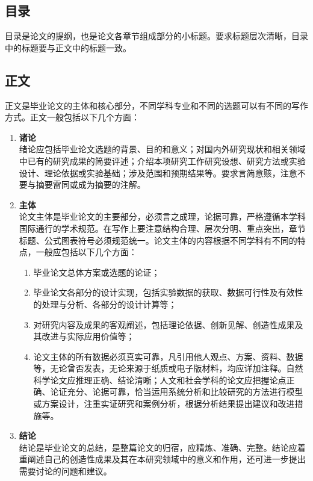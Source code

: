 \subsection{目录}

目录是论文的提纲，也是论文各章节组成部分的小标题。要求标题层次清晰，目录中的标题要与正文中的标题一致。


\subsection{正文}

正文是毕业论文的主体和核心部分，不同学科专业和不同的选题可以有不同的写作方式。正文一般包括以下几个方面：

\begin{enumerate}
    \item \textbf{诸论} \\
    绪论应包括毕业论文选题的背景、目的和意义；对国内外研究现状和相关领域中已有的研究成果的简要评述；介绍本项研究工作研究设想、研究方法或实验设计、理论依据或实验基础；涉及范围和预期结果等。要求言简意赅，注意不要与摘要雷同或成为摘要的注解。
    \item \textbf{主体} \\
    论文主体是毕业论文的主要部分，必须言之成理，论据可靠，严格遵循本学科国际通行的学术规范。在写作上要注意结构合理、层次分明、重点突出，章节标题、公式图表符号必须规范统一。论文主体的内容根据不同学科有不同的特点，一般应包括以下几个方面：
    \begin{enumerate}
        \item 毕业论文总体方案或选题的论证；
        \item 毕业论文各部分的设计实现，包括实验数据的获取、数据可行性及有效性的处理与分析、各部分的设计计算等；
        \item 对研究内容及成果的客观阐述，包括理论依据、创新见解、创造性成果及其改进与实际应用价值等；
        \item 论文主体的所有数据必须真实可靠，凡引用他人观点、方案、资料、数据等，无论曾否发表，无论来源于纸质或电子版材料，均应详加注释。自然科学论文应推理正确、结论清晰；人文和社会学科的论文应把握论点正确、论证充分、论据可靠，恰当运用系统分析和比较研究的方法进行模型或方案设计，注重实证研究和案例分析，根据分析结果提出建议和改进措施等。
    \end{enumerate}
    \item \textbf{结论} \\
    结论是毕业论文的总结，是整篇论文的归宿，应精炼、准确、完整。结论应着重阐述自己的创造性成果及其在本研究领域中的意义和作用，还可进一步提出需要讨论的问题和建议。
\end{enumerate}

